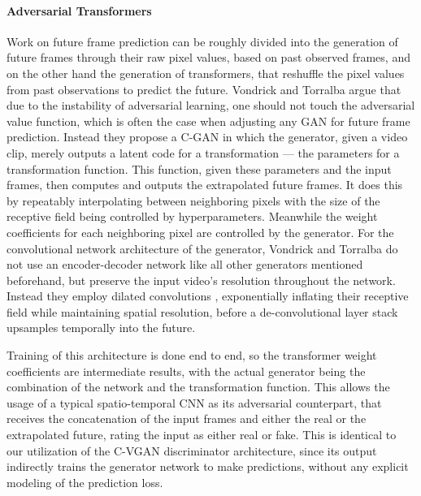 \paragraph{Adversarial Transformers} 
Work on future frame prediction can be roughly divided into the generation of future frames through their raw pixel values, based on past observed frames, and on the other hand the generation of transformers, that reshuffle the pixel values from past observations to predict the future. Vondrick and Torralba \cite{vondrick2017generating} argue that due to the instability of adversarial learning, one should not touch the adversarial value function, which is often the case when adjusting any GAN for future frame prediction. Instead they propose a C-GAN in which the generator, given a video clip, merely outputs a latent code for a transformation --- the parameters for a transformation function. This function, given these parameters and the input frames, then computes and outputs the extrapolated future frames. It does this by repeatably interpolating between neighboring pixels with the size of the receptive field being controlled by hyperparameters. Meanwhile the weight coefficients for each neighboring pixel are controlled by the generator. For the convolutional network architecture of the generator, Vondrick and Torralba do not use an encoder-decoder network like all other generators mentioned beforehand, but preserve the input video's resolution throughout the network. Instead they employ dilated convolutions \cite{yu2015multi}, exponentially inflating their receptive field while maintaining spatial resolution, before a de-convolutional layer stack upsamples temporally into the future.

Training of this architecture is done end to end, so the transformer weight coefficients are intermediate results, with the actual generator being the combination of the network and the transformation function. This allows the usage of a typical spatio-temporal CNN as its adversarial counterpart, that receives the concatenation of the input frames and either the real or the extrapolated future, rating the input as either real or fake. This is identical to our utilization of the C-VGAN discriminator architecture, since its output indirectly trains the generator network to make predictions, without any explicit modeling of the prediction loss.

